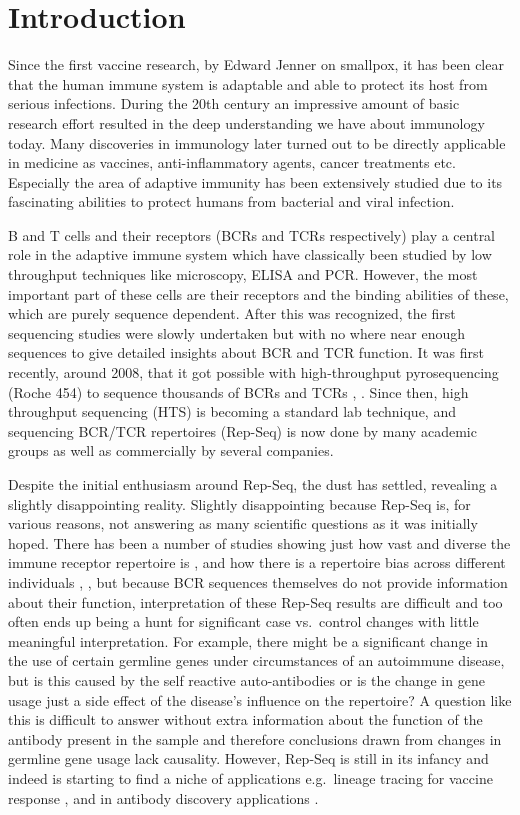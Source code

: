 \chapter{Introduction}
Since the first vaccine research, by Edward Jenner on smallpox, it has been clear that the human immune system is adaptable and able to protect its host from serious infections.
During the 20th century an impressive amount of basic research effort resulted in the deep understanding we have about immunology today.
Many discoveries in immunology later turned out to be directly applicable in medicine as vaccines, anti-inflammatory agents, cancer treatments etc.
Especially the area of adaptive immunity has been extensively studied due to its fascinating abilities to protect humans from bacterial and viral infection.

B and T cells and their receptors (BCRs and TCRs respectively) play a central role in the adaptive immune system which have classically been studied by low throughput techniques like microscopy, ELISA and PCR.
However, the most important part of these cells are their receptors and the binding abilities of these, which are purely sequence dependent.
After this was recognized, the first sequencing studies were slowly undertaken but with no where near enough sequences to give detailed insights about BCR and TCR function.
It was first recently, around 2008, that it got possible with high-throughput pyrosequencing (Roche 454) to sequence thousands of BCRs and TCRs \cite{campbell2008subclonal}, \cite{boyd2008high}.
Since then, high throughput sequencing (HTS) is becoming a standard lab technique, and sequencing BCR/TCR repertoires (Rep-Seq) is now done by many academic groups as well as commercially by several companies.

Despite the initial enthusiasm around Rep-Seq, the dust has settled, revealing a slightly disappointing reality.
Slightly disappointing because Rep-Seq is, for various reasons, not answering as many scientific questions as it was initially hoped.
There has been a number of studies showing just how vast and diverse the immune receptor repertoire is \cite{zhang20173d}, \cite{elhanati2015inferring} and how there is a repertoire bias across different individuals \cite{dewitt2016public}, \cite{vander2017dysregulation}, but because BCR sequences themselves do not provide information about their function, interpretation of these Rep-Seq results are difficult and too often ends up being a hunt for significant case vs.\ control changes with little meaningful interpretation.
For example, there might be a significant change in the use of certain germline genes under circumstances of an autoimmune disease, but is this caused by the self reactive auto-antibodies or is the change in gene usage just a side effect of the disease's influence on the repertoire?
A question like this is difficult to answer without extra information about the function of the antibody present in the sample and therefore conclusions drawn from changes in germline gene usage lack causality.
However, Rep-Seq is still in its infancy and indeed is starting to find a niche of applications e.g.\ lineage tracing for vaccine response \cite{Doria-Rose2014-vi}, \cite{Wu2011-yj} and in antibody discovery applications \cite{reddy2010monoclonal}.

